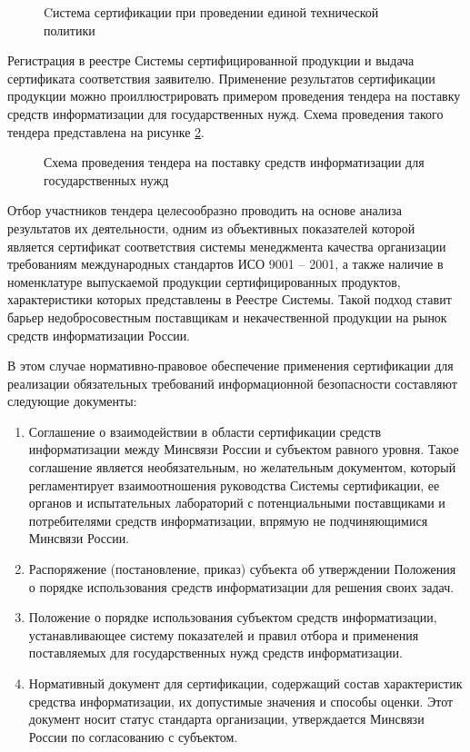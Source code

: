 \begin{figure}[h!]
\caption{Cистема сертификации при проведении единой технической политики}
\label{sistsert:pon2}
\end{figure}

Регистрация в реестре Системы сертифицированной продукции и выдача сертификата соответствия заявителю.
Применение результатов сертификации продукции можно проиллюстрировать примером проведения тендера на поставку средств информатизации для государственных нужд. Схема проведения такого тендера представлена на рисунке \ref{tender:pon3}.

\begin{figure}[h!]
\caption{Схема проведения тендера на поставку средств информатизации для государственных нужд}
\label{tender:pon3}
\end{figure}

Отбор участников тендера целесообразно проводить на основе анализа результатов их деятельности, одним из объективных показателей которой является сертификат соответствия системы менеджмента качества организации требованиям международных стандартов ИСО 9001 – 2001, а также наличие в номенклатуре выпускаемой продукции сертифицированных продуктов, характеристики которых представлены в Реестре Системы. Такой подход ставит барьер недобросовестным поставщикам и некачественной продукции на рынок средств информатизации России.

В этом случае нормативно-правовое обеспечение применения сертификации для реализации обязательных требований информационной безопасности составляют следующие документы:

\begin{enumerate}
\item Соглашение о взаимодействии в области сертификации средств информатизации между Минсвязи России и субъектом равного уровня. Такое соглашение является необязательным, но желательным документом, который регламентирует взаимоотношения руководства Системы сертификации, ее органов и испытательных лабораторий с потенциальными поставщиками и потребителями средств информатизации, впрямую не подчиняющимися Минсвязи России.
\item Распоряжение (постановление, приказ) субъекта об утверждении Положения о порядке использования средств информатизации для решения своих задач.
\item Положение о порядке использования субъектом средств информатизации, устанавливающее систему показателей и правил отбора и применения поставляемых для государственных нужд средств информатизации.
\item Нормативный документ для сертификации, содержащий состав характеристик средства информатизации, их допустимые значения и способы оценки. Этот документ носит статус стандарта организации, утверждается Минсвязи России по согласованию с субъектом.
\end{enumerate}

